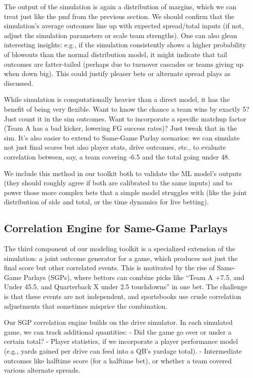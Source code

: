 \documentclass[11pt]{amsart}
\begin{document}
The output of the simulation is again a distribution of margins, which we can treat just like the pmf from the previous section. We should confirm that the simulation’s average outcomes line up with expected spread/total inputs (if not, adjust the simulation parameters or scale team strengths). One can also glean interesting insights: e.g., if the simulation consistently shows a higher probability of blowouts than the normal distribution model, it might indicate that tail outcomes are fatter-tailed (perhaps due to turnover cascades or teams giving up when down big). This could justify pleaser bets or alternate spread plays as discussed.

While simulation is computationally heavier than a direct model, it has the benefit of being very flexible. Want to know the chance a team wins by exactly 5? Just count it in the sim outcomes. Want to incorporate a specific matchup factor (Team A has a bad kicker, lowering FG success rates)? Just tweak that in the sim. It’s also easier to extend to Same-Game Parlay scenarios: we can simulate not just final scores but also player stats, drive outcomes, etc., to evaluate correlation between, say, a team covering -6.5 and the total going under 48.

We include this method in our toolkit both to validate the ML model’s outputs (they should roughly agree if both are calibrated to the same inputs) and to power those more complex bets that a simple model struggles with (like the joint distribution of side and total, or the time dynamics for live betting).

\subsection{Correlation Engine for Same-Game Parlays}
The third component of our modeling toolkit is a specialized extension of the simulation: a joint outcome generator for a game, which produces not just the final score but other correlated events. This is motivated by the rise of Same-Game Parlays (SGPs), where bettors can combine picks like “Team A +7.5, and Under 45.5, and Quarterback X under 2.5 touchdowns” in one bet. The challenge is that these events are not independent, and sportsbooks use crude correlation adjustments that sometimes misprice the combination.

Our SGP correlation engine builds on the drive simulator. In each simulated game, we can track additional quantities:
- Did the game go over or under a certain total?
- Player statistics, if we incorporate a player performance model (e.g., yards gained per drive can feed into a QB’s yardage total).
- Intermediate outcomes like halftime score (for a halftime bet), or whether a team covered various alternate spreads.
\end{document}
